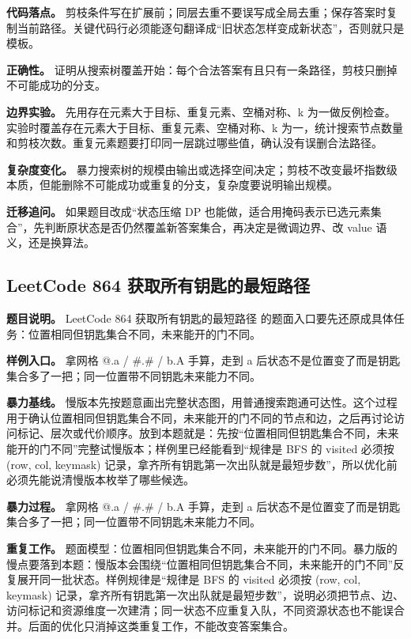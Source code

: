 \textbf{代码落点。} 剪枝条件写在扩展前；同层去重不要误写成全局去重；保存答案时复制当前路径。关键代码行必须能逐句翻译成“旧状态怎样变成新状态”，否则就只是模板。

\textbf{正确性。} 证明从搜索树覆盖开始：每个合法答案有且只有一条路径，剪枝只删掉不可能成功的分支。

\textbf{边界实验。} 先用存在元素大于目标、重复元素、空桶对称、k 为一做反例检查。实验时覆盖存在元素大于目标、重复元素、空桶对称、k 为一，统计搜索节点数量和剪枝次数。重复元素题要打印同一层跳过哪些值，确认没有误删合法路径。

\textbf{复杂度变化。} 暴力搜索树的规模由输出或选择空间决定；剪枝不改变最坏指数级本质，但能删除不可能成功或重复的分支，复杂度要说明输出规模。

\textbf{迁移追问。} 如果题目改成“状态压缩 DP 也能做，适合用掩码表示已选元素集合”，先判断原状态是否仍然覆盖新答案集合，再决定是微调边界、改 value 语义，还是换算法。

\subsection{LeetCode 864 获取所有钥匙的最短路径}

\textbf{题目说明。} LeetCode 864 获取所有钥匙的最短路径 的题面入口要先还原成具体任务：位置相同但钥匙集合不同，未来能开的门不同。

\textbf{样例入口。} 拿网格 @.a / \#.\# / b.A 手算，走到 a 后状态不是位置变了而是钥匙集合多了一把；同一位置带不同钥匙未来能力不同。

\textbf{暴力基线。} 慢版本先按题意画出完整状态图，用普通搜索跑通可达性。这个过程用于确认位置相同但钥匙集合不同，未来能开的门不同的节点和边，之后再讨论访问标记、层次或代价顺序。放到本题就是：先按“位置相同但钥匙集合不同，未来能开的门不同”完整试慢版本；样例里已经能看到“规律是 BFS 的 visited 必须按 (row, col, keymask) 记录，拿齐所有钥匙第一次出队就是最短步数”，所以优化前必须先能说清慢版本枚举了哪些候选。

\textbf{暴力过程。} 拿网格 @.a / \#.\# / b.A 手算，走到 a 后状态不是位置变了而是钥匙集合多了一把；同一位置带不同钥匙未来能力不同。

\textbf{重复工作。} 题面模型：位置相同但钥匙集合不同，未来能开的门不同。暴力版的慢点要落到本题：慢版本会围绕“位置相同但钥匙集合不同，未来能开的门不同”反复展开同一批状态。样例规律是“规律是 BFS 的 visited 必须按 (row, col, keymask) 记录，拿齐所有钥匙第一次出队就是最短步数”，说明必须把节点、边、访问标记和资源维度一次建清；同一状态不应重复入队，不同资源状态也不能误合并。后面的优化只消掉这类重复工作，不能改变答案集合。

